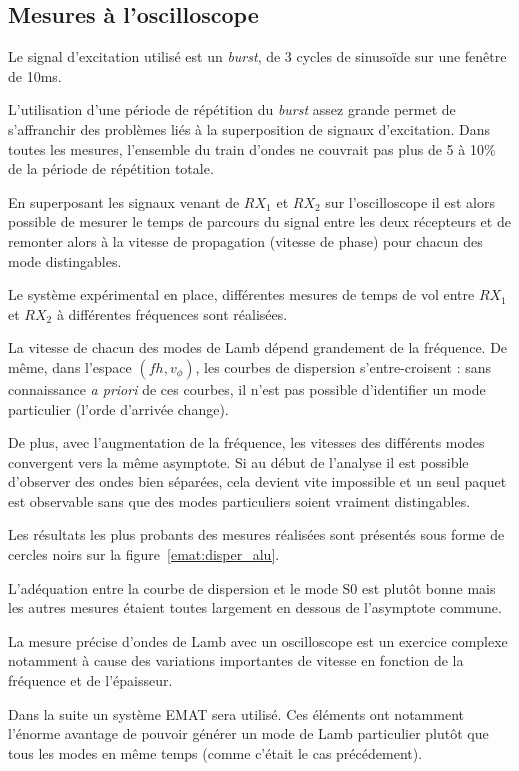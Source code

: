 \subsection{Mesures à l'oscilloscope}\label{emat:sec:oscillo}

Le signal d'excitation utilisé est un \textit{burst}, de 3 cycles de sinusoïde sur une fenêtre de 10ms.

L'utilisation d'une période de répétition du \textit{burst} assez grande permet de
s'affranchir des problèmes liés à la superposition de signaux d'excitation. Dans toutes
les mesures, l'ensemble du train d'ondes ne couvrait pas plus de 5 à 10\% de la période de
répétition totale.

En superposant les signaux venant de $RX_1$ et $RX_2$ sur l'oscilloscope il est alors
possible de mesurer le temps de parcours du signal entre les deux récepteurs et de
remonter alors à la vitesse de propagation (vitesse de phase) pour chacun des mode
distingables.

Le système expérimental en place, différentes mesures de temps de vol entre $RX_1$ et
$RX_2$ à différentes fréquences sont réalisées.


La vitesse de chacun des modes de Lamb dépend grandement de la fréquence. De même, dans
l'espace $(fh,v_\phi)$, les courbes de dispersion s'entre-croisent : sans
connaissance \textit{a priori} de ces courbes, il n'est pas possible d'identifier un mode
particulier (l'orde d'arrivée change).

De plus, avec l'augmentation de la fréquence, les vitesses des différents modes convergent vers la même asymptote. Si au début de l'analyse il est possible d'observer des ondes bien séparées, cela devient vite impossible et un seul paquet est observable sans que des modes particuliers soient vraiment distingables.

Les résultats les plus probants des mesures réalisées sont présentés sous forme de cercles
noirs sur la figure~\ref{emat:disper_alu}.

L'adéquation entre la courbe de dispersion et le mode S0 est plutôt bonne mais les autres
mesures étaient toutes largement en dessous de l'asymptote commune.

La mesure précise d'ondes de Lamb avec un oscilloscope est un exercice complexe notamment
à cause des variations importantes de vitesse en fonction de la fréquence et de
l'épaisseur.

Dans la suite un système EMAT sera utilisé. Ces éléments ont notamment l'énorme avantage
de pouvoir générer un mode de Lamb particulier plutôt que tous les modes en même temps
(comme c'était le cas précédement).

